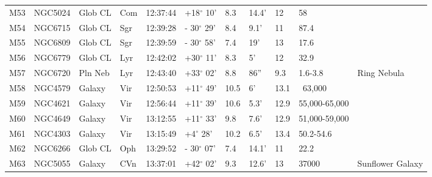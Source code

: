 \begin{longtable}{@{}lllllllllll@{}}
M53        & NGC5024     & Glob CL    & Com       & 12:37:44 & +18$^{\circ}$ 10'  & 8.3       & 14.4'                & 12       & 58                  &                                           \\
M54        & NGC6715     & Glob CL    & Sgr       & 12:39:28 & - 30$^{\circ}$ 29' & 8.4       & 9.1'                 & 11       & 87.4                &                                           \\
M55        & NGC6809     & Glob CL    & Sgr       & 12:39:59 & - 30$^{\circ}$ 58' & 7.4       & 19'                  & 13       & 17.6                &                                           \\
M56        & NGC6779     & Glob CL    & Lyr       & 12:42:02 & +30$^{\circ}$ 11'  & 8.3       & 5'                   & 12       & 32.9                &                                           \\
M57        & NGC6720     & Pln Neb    & Lyr       & 12:43:40 & +33$^{\circ}$ 02'  & 8.8       & 86''                 & 9.3      & 1.6-3.8             & Ring Nebula                               \\
M58        & NGC4579     & Galaxy     & Vir       & 12:50:53 & +11$^{\circ}$ 49'  & 10.5      & 6'                   & 13.1     & ~63,000             &                                           \\
M59        & NGC4621     & Galaxy     & Vir       & 12:56:44 & +11$^{\circ}$ 39'  & 10.6      & 5.3'                 & 12.9     & 55,000-65,000       &                                           \\
M60        & NGC4649     & Galaxy     & Vir       & 13:12:55 & +11$^{\circ}$ 33'  & 9.8       & 7.6'                 & 12.9     & 51,000-59,000       &                                           \\
M61        & NGC4303     & Galaxy     & Vir       & 13:15:49 & +4$^{\circ}$ 28'   & 10.2      & 6.5'                 & 13.4     & 50.2-54.6           &                                           \\
M62        & NGC6266     & Glob CL    & Oph       & 13:29:52 & - 30$^{\circ}$ 07' & 7.4       & 14.1'                & 11       & 22.2                &                                           \\
M63        & NGC5055     & Galaxy     & CVn       & 13:37:01 & +42$^{\circ}$ 02'  & 9.3       & 12.6'                & 13       & 37000               & Sunflower Galaxy                          \\

\end{longtable}

